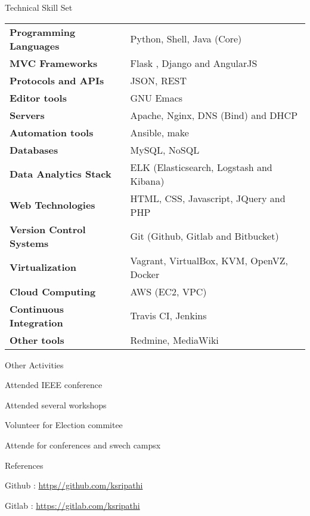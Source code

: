 \documentclass{resume} %
\begin{document}
\begin{rSection}
  {Technical Skill Set}

  \begin{tabular}{ @{} >{\bfseries}l @{\hspace{6ex}} l }
    Programming Languages & Python, Shell, Java (Core) \\
    MVC Frameworks & Flask , Django and AngularJS\\
    Protocols and APIs & JSON, REST \\
    Editor tools & GNU Emacs \\
    Servers & Apache, Nginx, DNS (Bind) and DHCP \\  
    Automation tools & Ansible, make \\
    Databases &  MySQL, NoSQL \\
    Data Analytics Stack & ELK (Elasticsearch, Logstash and Kibana) \\
    Web Technologies & HTML, CSS, Javascript, JQuery and PHP \\
    Version Control Systems & Git (Github, Gitlab and Bitbucket) \\
    Virtualization & Vagrant, VirtualBox, KVM, OpenVZ, Docker \\
    Cloud Computing & AWS (EC2, VPC) \\
    Continuous Integration & Travis CI, Jenkins \\
    Other tools & Redmine, MediaWiki
    
  \end{tabular}

\end{rSection}


\begin{rSection}{Other Activities}

\item Attended IEEE conference
\item Attended several workshops
\item Volunteer for Election commitee
\item Attende for conferences and swech campsx
 

\end{rSection}


\begin{rSection}{References}
\item Github : \url{https//github.com/ksripathi}

  \item Gitlab : \url { https://gitlab.com/ksripathi}

\end{rSection}
\end{document}
